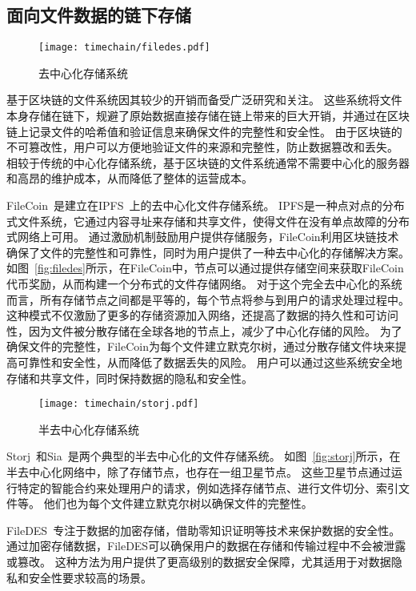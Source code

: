 \subsection{面向文件数据的链下存储}
\begin{figure}[t]
    \centering
    \texttt{[image: timechain/filedes.pdf]}
    \caption{去中心化存储系统}
    \label{fig:filedes}
\end{figure}

基于区块链的文件系统因其较少的开销而备受广泛研究和关注。
这些系统将文件本身存储在链下，规避了原始数据直接存储在链上带来的巨大开销，并通过在区块链上记录文件的哈希值和验证信息来确保文件的完整性和安全性。
由于区块链的不可篡改性，用户可以方便地验证文件的来源和完整性，防止数据篡改和丢失。
相较于传统的中心化存储系统，基于区块链的文件系统通常不需要中心化的服务器和高昂的维护成本，从而降低了整体的运营成本。

FileCoin~\cite{bauer2022filecoin}是建立在IPFS~\cite{benet2014ipfs}上的去中心化文件存储系统。
IPFS是一种点对点的分布式文件系统，它通过内容寻址来存储和共享文件，使得文件在没有单点故障的分布式网络上可用。
通过激励机制鼓励用户提供存储服务，FileCoin利用区块链技术确保了文件的完整性和可靠性，同时为用户提供了一种去中心化的存储解决方案。
如图~\autoref{fig:filedes}所示，在FileCoin中，节点可以通过提供存储空间来获取FileCoin代币奖励，从而构建一个分布式的文件存储网络。
对于这个完全去中心化的系统而言，所有存储节点之间都是平等的，每个节点将参与到用户的请求处理过程中。
这种模式不仅激励了更多的存储资源加入网络，还提高了数据的持久性和可访问性，因为文件被分散存储在全球各地的节点上，减少了中心化存储的风险。
为了确保文件的完整性，FileCoin为每个文件建立默克尔树，通过分散存储文件块来提高可靠性和安全性，从而降低了数据丢失的风险。
用户可以通过这些系统安全地存储和共享文件，同时保持数据的隐私和安全性。

\begin{figure}[t]
    \centering
    \texttt{[image: timechain/storj.pdf]}
    \caption{半去中心化存储系统}
    \label{fig:storj}
\end{figure}

Storj~\cite{storj2018storj}和Sia~\cite{vorick2014sia}是两个典型的半去中心化的文件存储系统。
如图~\autoref{fig:storj}所示，在半去中心化网络中，除了存储节点，也存在一组卫星节点。
这些卫星节点通过运行特定的智能合约来处理用户的请求，例如选择存储节点、进行文件切分、索引文件等。
他们也为每个文件建立默克尔树以确保文件的完整性。

FileDES~\cite{xu2024filedes}专注于数据的加密存储，借助零知识证明等技术来保护数据的安全性。
通过加密存储数据，FileDES可以确保用户的数据在存储和传输过程中不会被泄露或篡改。
这种方法为用户提供了更高级别的数据安全保障，尤其适用于对数据隐私和安全性要求较高的场景。

